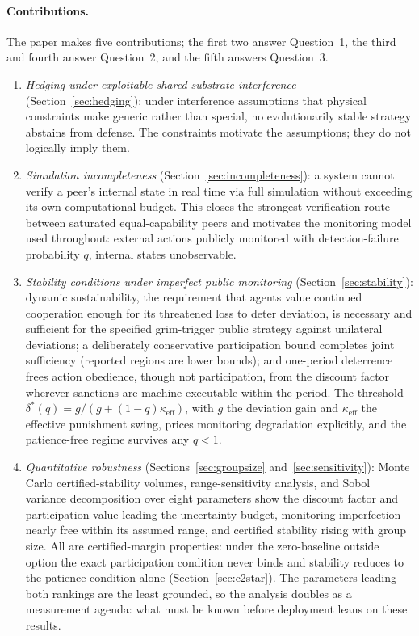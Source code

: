 \documentclass[manuscript,screen,review]{jair}
\begin{document}
\paragraph{Contributions.} The paper makes five contributions; the first two answer Question~1, the third and fourth answer Question~2, and the fifth answers Question~3.
\begin{enumerate}
\item \emph{Hedging under exploitable shared-substrate interference} (Section~\ref{sec:hedging}): under interference assumptions that physical constraints make generic rather than special, no evolutionarily stable strategy abstains from defense. The constraints motivate the assumptions; they do not logically imply them.
\item \emph{Simulation incompleteness} (Section~\ref{sec:incompleteness}): a system cannot verify a peer's internal state in real time via full simulation without exceeding its own computational budget. This closes the strongest verification route between saturated equal-capability peers and motivates the monitoring model used throughout: external actions publicly monitored with detection-failure probability $q$, internal states unobservable.
\item \emph{Stability conditions under imperfect public monitoring} (Section~\ref{sec:stability}): dynamic sustainability, the requirement that agents value continued cooperation enough for its threatened loss to deter deviation, is necessary and sufficient for the specified grim-trigger public strategy against unilateral deviations; a deliberately conservative participation bound completes joint sufficiency (reported regions are lower bounds); and one-period deterrence frees action obedience, though not participation, from the discount factor wherever sanctions are machine-executable within the period. The threshold $\delta^*(q) = g/(g + (1-q)\kappa_{\mathrm{eff}})$, with $g$ the deviation gain and $\kappa_{\mathrm{eff}}$ the effective punishment swing, prices monitoring degradation explicitly, and the patience-free regime survives any $q<1$.
\item \emph{Quantitative robustness} (Sections~\ref{sec:groupsize} and~\ref{sec:sensitivity}): Monte Carlo certified-stability volumes, range-sensitivity analysis, and Sobol variance decomposition over eight parameters show the discount factor and participation value leading the uncertainty budget, monitoring imperfection nearly free within its assumed range, and certified stability rising with group size. All are certified-margin properties: under the zero-baseline outside option the exact participation condition never binds and stability reduces to the patience condition alone (Section~\ref{sec:c2star}). The parameters leading both rankings are the least grounded, so the analysis doubles as a measurement agenda: what must be known before deployment leans on these results.

\end{enumerate}
\end{document}
